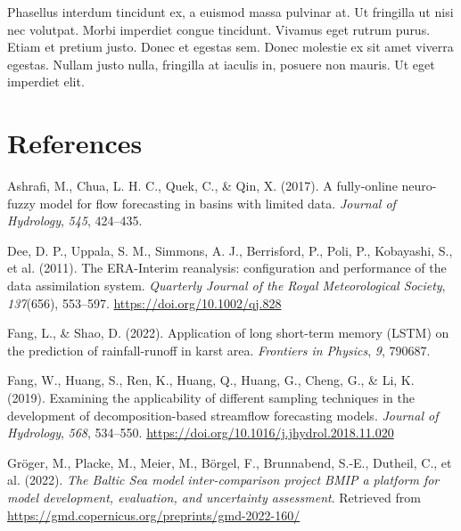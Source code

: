 \documentclass[
]{agujournal2019}
\newlength{\cslhangindent}
\newenvironment{CSLReferences}[2] %
 {\begin{list}{}{%
  \setlength{\itemindent}{0pt}
  \setlength{\leftmargin}{0pt}
  \setlength{\parsep}{0pt}
  \ifodd #1
   \setlength{\leftmargin}{\cslhangindent}
   \setlength{\itemindent}{-1\cslhangindent}
  \fi
  \setlength{\itemsep}{#2\baselineskip}}}
 {\end{list}}
\begin{document}
Phasellus interdum tincidunt ex, a euismod massa pulvinar at. Ut
fringilla ut nisi nec volutpat. Morbi imperdiet congue tincidunt.
Vivamus eget rutrum purus. Etiam et pretium justo. Donec et egestas sem.
Donec molestie ex sit amet viverra egestas. Nullam justo nulla,
fringilla at iaculis in, posuere non mauris. Ut eget imperdiet elit.

\section*{References}\label{references}

\label{refs}
\begin{CSLReferences}{1}{0}
\vspace{1em}

Ashrafi, M., Chua, L. H. C., Quek, C., \& Qin, X. (2017). A fully-online
neuro-fuzzy model for flow forecasting in basins with limited data.
\emph{Journal of Hydrology}, \emph{545}, 424--435.

Dee, D. P., Uppala, S. M., Simmons, A. J., Berrisford, P., Poli, P.,
Kobayashi, S., et al. (2011). The ERA-Interim reanalysis: configuration
and performance of the data assimilation system. \emph{Quarterly Journal
of the Royal Meteorological Society}, \emph{137}(656), 553--597.
\url{https://doi.org/10.1002/qj.828}

Fang, L., \& Shao, D. (2022). Application of long short-term memory
(LSTM) on the prediction of rainfall-runoff in karst area.
\emph{Frontiers in Physics}, \emph{9}, 790687.

Fang, W., Huang, S., Ren, K., Huang, Q., Huang, G., Cheng, G., \& Li, K.
(2019). Examining the applicability of different sampling techniques in
the development of decomposition-based streamflow forecasting models.
\emph{Journal of Hydrology}, \emph{568}, 534--550.
\url{https://doi.org/10.1016/j.jhydrol.2018.11.020}

Gröger, M., Placke, M., Meier, M., Börgel, F., Brunnabend, S.-E.,
Dutheil, C., et al. (2022). \emph{The Baltic Sea model inter-comparison
project BMIP {\textendash} a platform for model development, evaluation,
and uncertainty assessment}. Retrieved from
\url{https://gmd.copernicus.org/preprints/gmd-2022-160/}


\end{CSLReferences}
\end{document}
